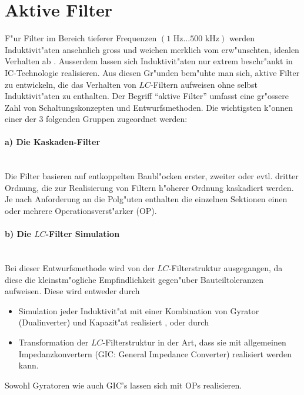 \clearpage
\section{Aktive Filter}
F"ur Filter im Bereich tieferer Frequenzen $(1\mbox{~Hz} \ldots 500\mbox{~kHz})$
werden Induktivit"aten ansehnlich gross und weichen merklich vom
erw"unschten, idealen Verhalten ab \cite{MOS:89}. Ausser\-dem lassen sich
Induktivit"aten nur extrem beschr"ankt in IC-Technologie realisieren. Aus diesen
Gr"unden bem"uhte man sich, aktive Filter zu entwickeln, die das
Verhalten von $LC$-Filtern aufweisen ohne selbst Induktivit"aten zu
enthalten. Der Begriff ``aktive Filter'' umfasst eine gr"ossere Zahl
von Schaltungskonzepten und Entwurfsmethoden. Die wichtigsten k"onnen
einer der 3 folgenden Gruppen zugeordnet werden:
\paragraph{a) Die Kaskaden-Filter}~\\
Die Filter basieren auf entkoppelten Baubl"ocken erster, zweiter oder evtl.
dritter Ordnung, die zur Realisierung von Filtern h"oherer Ordnung kaskadiert
werden. Je nach Anforderung an die Polg"uten enthalten die einzelnen 
Sektionen einen oder mehrere Operationsverst"arker (OP).
\paragraph{b) Die {\boldmath $LC$}-Filter Simulation}~\\
Bei dieser Entwurfsmethode wird von der $LC$-Filterstruktur ausgegangen,
da diese die kleinstm"ogliche Empfindlichkeit gegen"uber
Bauteiltoleranzen aufweisen.  Diese wird entweder durch
\begin{itemize}
\item Simulation jeder Induktivit"at mit einer Kombination von Gyrator (Dualinverter)  und Kapazit"at
  realisiert \cite{LIN:BRA:LEH:85, MOS:89}, oder durch
\item Transformation der $LC$-Filterstruktur in der Art, dass sie mit allgemeinen
  Impedanzkonvertern (GIC: General Impedance Converter) realisiert werden
  kann.
\end{itemize}
\nit Sowohl Gyratoren wie auch GIC's lassen sich mit OPs realisieren.
